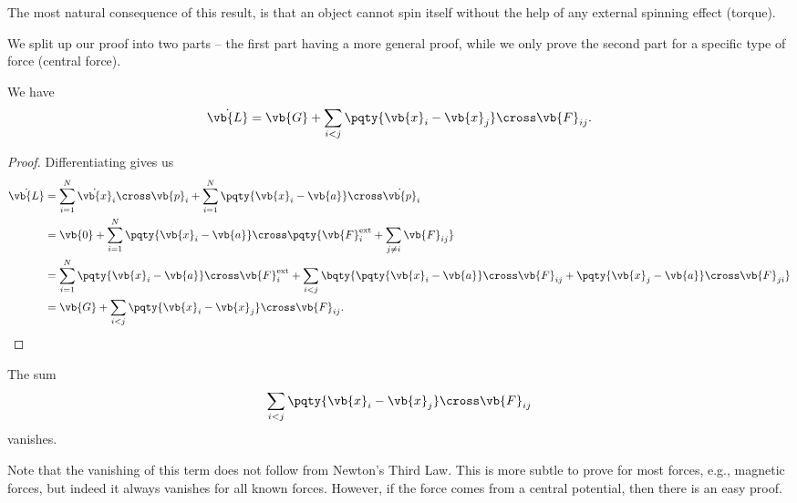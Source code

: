 The most natural consequence of this result, is that an object cannot spin itself without the help of any external spinning effect (torque).

We split up our proof into two parts -- the first part having a more general proof, while we only prove the second part for a specific type of force (central force).

\begin{lemma}
    \label{lem:rate-of-change-ang-mom}%
    We have
    \begin{equation}
        \dot{\vb{L}} = \vb{G} + \sum_{i < j} \pqty{\vb{x}_i - \vb{x}_j} \cross \vb{F}_{ij}.
    \end{equation}
\end{lemma}

\begin{proof}
    Differentiating gives us
    \begin{subequations}\begin{align}
        \dot{\vb{L}} &= \sum_{i = 1}^{N} \dot{\vb{x}}_i \cross \vb{p}_i + \sum_{i = 1}^{N} \pqty{\vb{x}_i - \vb{a}} \cross \dot{\vb{p}}_i \\
        &= \vb{0} + \sum_{i = 1}^{N} \pqty{\vb{x}_i - \vb{a}} \cross \pqty{\vb{F}_i^{\text{ext}} + \sum_{j \neq i} \vb{F}_{ij}} \\
        &= \sum_{i = 1}^{N} \pqty{\vb{x}_i - \vb{a}} \cross \vb{F}_i^{\text{ext}} + \sum_{i < j} \bqty{\pqty{\vb{x}_i - \vb{a}} \cross \vb{F}_{ij} + \pqty{\vb{x}_j - \vb{a}} \cross \vb{F}_{ji}} \\
        &= \vb{G} + \sum_{i < j} \pqty{\vb{x}_i - \vb{x}_j} \cross \vb{F}_{ij}.
    \end{align}\end{subequations}
\end{proof}

\begin{lemma}
    \label{lem:vanishing-of-symmetric-term}%
    The sum
    \begin{equation}
        \sum_{i < j} \pqty{\vb{x}_i - \vb{x}_j} \cross \vb{F}_{ij}
    \end{equation}
    vanishes.
\end{lemma}

Note that the vanishing of this term does not follow from Newton's Third Law. This is more subtle to prove for most forces, e.g., magnetic forces, but indeed it always vanishes for all known forces. However, if the force comes from a central potential, then there is an easy proof.

